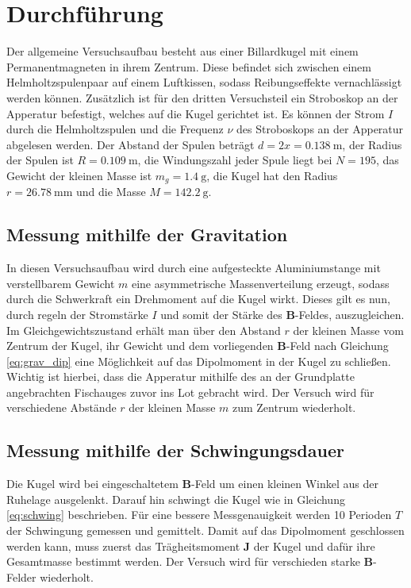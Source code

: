 \section{Durchführung}
\label{sec:Durchführung}
Der allgemeine Versuchsaufbau besteht aus einer Billardkugel mit einem Permanentmagneten in ihrem Zentrum.
Diese befindet sich zwischen einem Helmholtzspulenpaar auf einem Luftkissen, sodass Reibungseffekte vernachlässigt werden können.
Zusätzlich ist für den dritten Versuchsteil ein Stroboskop an der Apperatur befestigt, welches auf die Kugel gerichtet ist.
Es können der Strom $I$ durch die Helmholtzspulen und die Frequenz $\nu$ des Stroboskops an der Apperatur abgelesen werden.
Der Abstand der Spulen beträgt \mbox{$d=2x=\SI{0.138}{\meter}$}, der Radius der Spulen ist $R=\SI{0.109}{\meter}$,
die Windungszahl jeder Spule liegt bei $N=\num{195}$, das Gewicht der kleinen Masse ist $m_g = \SI{1.4}{\gram}$, die Kugel hat den Radius $r=\SI{26.78}{\milli\meter}$ und die Masse $M=\SI{142.2}{\gram}$.
%
\subsection{Messung mithilfe der Gravitation}
In diesen Versuchsaufbau wird durch eine aufgesteckte Aluminiumstange mit verstellbarem Gewicht $m$ eine asymmetrische Massenverteilung erzeugt,
sodass durch die Schwerkraft ein Drehmoment auf die Kugel wirkt.
Dieses gilt es nun, durch regeln der Stromstärke $I$ und somit der Stärke des $\symbf{B}$-Feldes, auszugleichen.
Im Gleichgewichtszustand
erhält man über den Abstand $r$ der kleinen Masse vom Zentrum der Kugel, ihr Gewicht und dem vorliegenden $\symbf{B}$-Feld
nach Gleichung \eqref{eq:grav_dip} eine Möglichkeit auf das Dipolmoment in der Kugel zu schließen.
Wichtig ist hierbei, dass die Apperatur mithilfe des an der Grundplatte angebrachten Fischauges zuvor ins Lot gebracht wird.
Der Versuch wird für verschiedene Abstände $r$ der kleinen Masse $m$ zum Zentrum wiederholt.
%
\subsection{Messung mithilfe der Schwingungsdauer}
Die Kugel wird bei eingeschaltetem $\symbf{B}$-Feld um einen kleinen Winkel aus der Ruhelage ausgelenkt.
Darauf hin schwingt die Kugel wie in Gleichung \eqref{eq:schwing} beschrieben.
Für eine bessere Messgenauigkeit werden 10 Perioden $T$ der Schwingung gemessen und gemittelt.
Damit auf das Dipolmoment geschlossen werden kann, muss zuerst das Trägheitsmoment $\symbf{J}$ der Kugel und dafür ihre Gesamtmasse bestimmt werden.
Der Versuch wird für verschieden starke $\symbf{B}$-Felder wiederholt.
%
